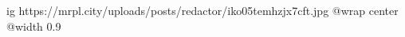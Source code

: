  
 
 
 
 

\ifcmt
  ig https://mrpl.city/uploads/posts/redactor/iko05temhzjx7cft.jpg
  @wrap center
  @width 0.9
\fi
